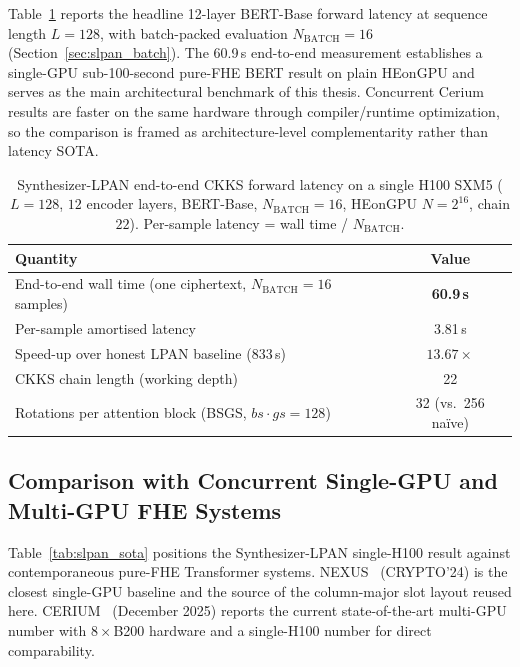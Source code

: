Table~\ref{tab:slpan_headline} reports the headline 12-layer BERT-Base forward latency at sequence length $L = 128$, with batch-packed evaluation $N_{\mathrm{BATCH}} = 16$ (Section~\ref{sec:slpan_batch}). The 60.9\,s end-to-end measurement establishes a single-GPU sub-100-second pure-FHE BERT result on plain HEonGPU and serves as the main architectural benchmark of this thesis. Concurrent Cerium results are faster on the same hardware through compiler/runtime optimization, so the comparison is framed as architecture-level complementarity rather than latency SOTA.

\begin{table}[htbp]
\centering
\caption{Synthesizer-LPAN end-to-end CKKS forward latency on a single H100 SXM5 ($L = 128$, $12$ encoder layers, BERT-Base, $N_{\mathrm{BATCH}} = 16$, HEonGPU $N{=}2^{16}$, chain $22$). Per-sample latency = wall time / $N_{\mathrm{BATCH}}$.}
\label{tab:slpan_headline}
\begin{tabular}{lc}
\toprule
\textbf{Quantity} & \textbf{Value} \\
\midrule
End-to-end wall time (one ciphertext, $N_{\mathrm{BATCH}} = 16$ samples) & \textbf{60.9\,s} \\
Per-sample amortised latency                                            & 3.81\,s \\
Speed-up over honest LPAN baseline ($833$\,s)                           & \textbf{$13.67\times$} \\
CKKS chain length (working depth)                                       & 22 \\
Rotations per attention block (BSGS, $bs \cdot gs = 128$)               & 32 (vs.\ 256 na\"ive) \\
\bottomrule
\end{tabular}
\end{table}

\subsection{Comparison with Concurrent Single-GPU and Multi-GPU FHE Systems}
\label{sec:slpan_comparison}

Table~\ref{tab:slpan_sota} positions the Synthesizer-LPAN single-H100 result against contemporaneous pure-FHE Transformer systems. NEXUS~\cite{zhang2024nexus} (CRYPTO'24) is the closest single-GPU baseline and the source of the column-major slot layout reused here. CERIUM~\cite{cerium2025} (December 2025) reports the current state-of-the-art multi-GPU number with $8\times$B200 hardware and a single-H100 number for direct comparability.


